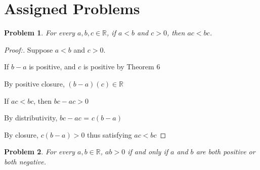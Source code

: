 \documentclass[12pt]{article}
\newtheorem{theorem}{Problem}[section]
\begin{document}
\section{Assigned Problems}

\begin{theorem}
    For every $a, b, c \in \mathbb{R}$, if $a < b$ and $c > 0$, then $ac < bc$.
\end{theorem}

\begin{proof}[Proof:]
    Suppose $a < b$ and $c > 0$.

    If $b - a$ is positive, and $c$ is positive by Theorem 6

    By positive closure, $(b-a)(c) \in \mathbb{R}$

    If $ac < bc$, then $bc - ac > 0$
    
    By distributivity, $bc - ac$ = $c(b-a)$

    By closure, $c(b-a) > 0$ thus satisfying $ac < bc$




    
\end{proof}

\newpage

\begin{theorem}
For every $a, b \in \mathbb{R}$, $ab > 0$ if and only if $a$ and $b$ are both positive or both negative.
\end{theorem}
\end{document}
